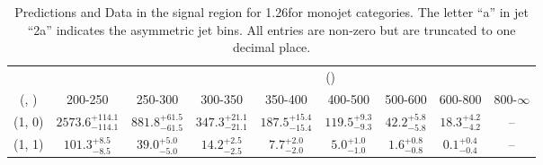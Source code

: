\begin{table}[h!]
\tiny
\centering
\caption{Predictions and Data in the signal region for 1.26\ifb for monojet categories. The letter ``a'' in jet \eg ``2a''  indicates the asymmetric jet bins. All entries are non-zero but are truncated to one decimal place.\label{tab:yieldsseppost_sig_zinv_mono}}
\begin{tabular}
{ccccccccc}
	\hline\hline
&	& \multicolumn{8}{c}{\scalht (\gev)} \\ 
	 (\njet,  \nb) & 200-250 & 250-300 & 300-350 & 350-400 & 400-500 & 500-600 & 600-800 & 800-$\infty$ \\ [0.8ex] 
\hline
	(1, 0) & $2573.6^{+ 114.1 }_{- 114.1 }$ & $881.8^{+ 61.5 }_{- 61.5 }$ & $347.3^{+ 21.1 }_{- 21.1 }$ & $187.5^{+ 15.4 }_{- 15.4 }$ & $119.5^{+ 9.3 }_{- 9.3 }$ & $42.2^{+ 5.8 }_{- 5.8 }$ & $18.3^{+ 4.2 }_{- 4.2 }$ & -- \\[0.5ex] 
	(1, 1) & $101.3^{+ 8.5 }_{- 8.5 }$ & $39.0^{+ 5.0 }_{- 5.0 }$ & $14.2^{+ 2.5 }_{- 2.5 }$ & $7.7^{+ 2.0 }_{- 2.0 }$ & $5.0^{+ 1.0 }_{- 1.0 }$ & $1.6^{+ 0.8 }_{- 0.8 }$ & $0.1^{+ 0.4 }_{- 0.4 }$ & -- \\[0.5ex] 
	\hline
	\hline
\end{tabular}
\end{table}
